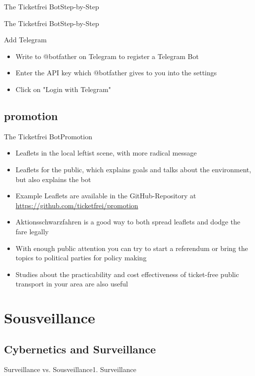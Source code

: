\documentclass[10pt]{beamer}
\begin{document}
{\begin{frame}{The Ticketfrei Bot}{Step-by-Step}
\end{frame}
\begin{frame}{The Ticketfrei Bot}{Step-by-Step}

\begin{block}{{Add Telegram}}
  \begin{itemize}
    \item Write to @botfather on Telegram to register a Telegram Bot
    \item Enter the API key which @botfather gives to you into the settings
    \item Click on "Login with Telegram"
  \end{itemize}
\end{block}

\end{frame}

\subsection{promotion}
\begin{frame}{The Ticketfrei Bot}{Promotion}

\begin{itemize}
  \item Leaflets in the local leftist scene, with more radical message
  \item Leaflets for the public, which explains goals and talks about the environment, but also explains the bot
  \item Example Leaflets are available in the GitHub-Repository at \url{https://github.com/ticketfrei/promotion}
  \item<2-> Aktionsschwarzfahren is a good way to both spread leaflets and dodge the fare legally
  \item<3-> With enough public attention you can try to start a referendum or bring the topics to political parties for policy making
  \item<4-> Studies about the practicability and cost effectiveness of ticket-free public transport in your area are also useful
\end{itemize}

\end{frame}

\section{Sousveillance}
\subsection{Cybernetics and Surveillance}
\begin{frame}{Surveillance vs. Sousveillance}{1. Surveillance}


\end{frame}}
\end{document}
